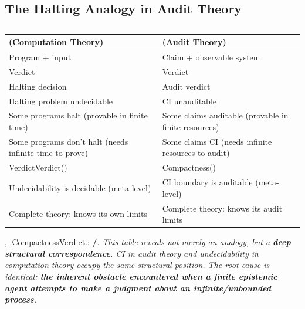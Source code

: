 \documentclass[12pt,a4paper]{article}
\theoremstyle{plain}
\theoremstyle{definition}
\theoremstyle{remark}
\begin{document}
\subsection{}
\subsection{The Halting Analogy in Audit Theory}
\begin{table}[H]
\centering
\begin{tabular}{p{} p{}}
\toprule
\textbf{ (Computation Theory)} & \textbf{ (Audit Theory)} \\
\midrule
Program + input & Claim + observable system \\
\midrule
Verdict & Verdict \\
Halting decision & Audit verdict \\
\midrule
Halting problem undecidable & CI unauditable \\
\midrule
Some programs halt (provable in finite time) & Some claims auditable (provable in finite resources) \\
\midrule
Some programs don't halt (needs infinite time to prove) & Some claims CI (needs infinite resources to audit) \\
\midrule
VerdictVerdict() & Compactness() \\
Undecidability is decidable (meta-level) & CI boundary is auditable (meta-level) \\
\midrule
Complete theory: knows its own limits & Complete theory: knows its audit limits \\
\bottomrule
\end{tabular}
\caption{}
\end{table}
\vspace{6pt}
\noindent
, .CompactnessVerdict.: \textbf{/}.
\vspace{4pt}
\noindent
\textit{This table reveals not merely an analogy, but a \textbf{deep structural correspondence}. CI in audit theory and undecidability in computation theory occupy the same structural position. The root cause is identical: \textbf{the inherent obstacle encountered when a finite epistemic agent attempts to make a judgment about an infinite/unbounded process}.}
\newpage
\section{}
\end{document}
